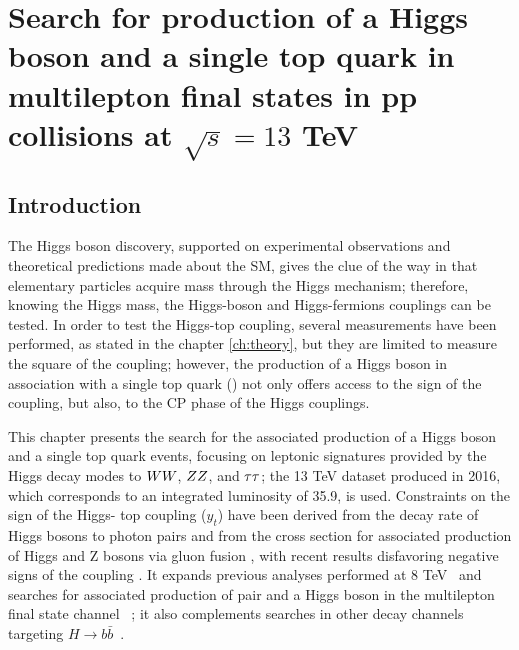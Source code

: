 \chapter{Search for production of a Higgs boson and a single top quark in multilepton final states in pp collisions at $\sqrt{s}=13$ TeV}\label{ch:analysis}

\section{Introduction}\label{sec:Intro_analysis}

The Higgs boson discovery, supported on experimental observations and theoretical predictions made about the SM, gives the clue of the way in that elementary particles acquire mass through the Higgs mechanism; therefore, knowing the Higgs mass, the Higgs-boson and Higgs-fermions couplings can be tested. In order to test the Higgs-top coupling, several measurements have been performed, as stated in the chapter \ref{ch:theory}, but they are limited to measure the square of the coupling; however, the production of a Higgs boson in association with a single top quark (\tH) not only offers access to the sign of the coupling, but also, to the CP phase of the Higgs couplings.

This chapter presents the search for the associated production of a Higgs boson and a single top quark events, focusing on leptonic signatures provided by the Higgs decay modes to $WW$, $ZZ$, and $\tau\tau$; the 13 TeV dataset produced in 2016, which corresponds to an integrated luminosity of 35.9\fbinv, is used. Constraints on the sign of the Higgs- top coupling ($y_t$) have been derived from the decay rate of Higgs bosons to photon pairs \cite{biswas} and from the cross section for associated production of Higgs and Z bosons via gluon fusion \cite{hespel}, with recent results disfavoring negative signs of the coupling \cite{cms_ht_couplings,comb_ht_couplings,diboson}. It expands previous analyses performed at 8 TeV~\cite{Khachatryan_2015,CMS_AN_2014-140} and searches for associated production of \ttbar pair and a Higgs boson in the multilepton final state channel ~\cite{CMS_AN_2016-211}; it also complements searches in other decay channels targeting $H\to b\bar{b}$~\cite{CMS_PAS_HIG_16-019}.

